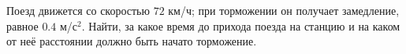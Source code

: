 Поезд движется со скоростью $72$ км/ч; при торможении он получает
замедление, равное $0.4$ м/с$^2$. Найти, за какое время до прихода
поезда на станцию и на каком от неё расстоянии должно быть начато
торможение.
